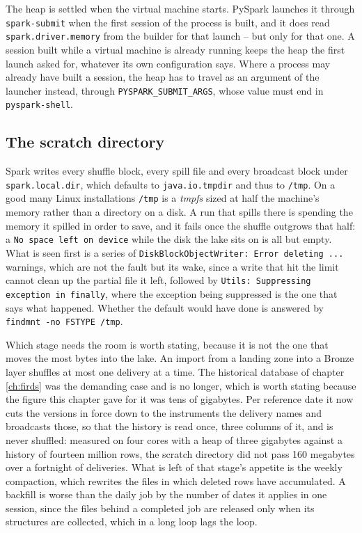 The heap is settled when the virtual machine starts. PySpark launches it through \verb|spark-submit| when the first session of the process is built, and it does read \verb|spark.driver.memory| from the builder for that launch -- but only for that one. A session built while a virtual machine is already running keeps the heap the first launch asked for, whatever its own configuration says. Where a process may already have built a session, the heap has to travel as an argument of the launcher instead, through \verb|PYSPARK_SUBMIT_ARGS|, whose value must end in \verb|pyspark-shell|.

\subsection{The scratch directory\label{sec:infra-scratch}}

Spark writes every shuffle block, every spill file and every broadcast block under \verb|spark.local.dir|, which defaults to \verb|java.io.tmpdir| and thus to \verb|/tmp|. On a good many Linux installations \verb|/tmp| is a \emph{tmpfs} sized at half the machine's memory rather than a directory on a disk. A run that spills there is spending the memory it spilled in order to save, and it fails once the shuffle outgrows that half: a \verb|No space left on device| while the disk the lake sits on is all but empty. What is seen first is a series of \verb|DiskBlockObjectWriter: Error deleting ...| warnings, which are not the fault but its wake, since a write that hit the limit cannot clean up the partial file it left, followed by \verb|Utils: Suppressing exception in finally|, where the exception being suppressed is the one that says what happened. Whether the default would have done is answered by \verb|findmnt -no FSTYPE /tmp|.

Which stage needs the room is worth stating, because it is not the one that moves the most bytes into the lake. An import from a landing zone into a Bronze layer shuffles at most one delivery at a time. The historical database of chapter \ref{ch:firds} was the demanding case and is no longer, which is worth stating because the figure this chapter gave for it was tens of gigabytes. Per reference date it now cuts the versions in force down to the instruments the delivery names and broadcasts those, so that the history is read once, three columns of it, and is never shuffled: measured on four cores with a heap of three gigabytes against a history of fourteen million rows, the scratch directory did not pass 160 megabytes over a fortnight of deliveries. What is left of that stage's appetite is the weekly compaction, which rewrites the files in which deleted rows have accumulated. A backfill is worse than the daily job by the number of dates it applies in one session, since the files behind a completed job are released only when its structures are collected, which in a long loop lags the loop.

